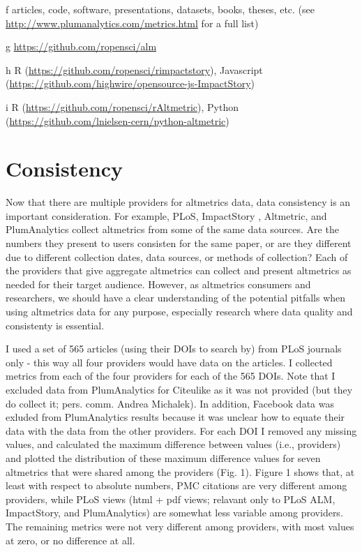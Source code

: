\documentclass[letterpaper,superscriptaddress,showkeys,longbibliography]{revtex4-1}\usepackage{graphicx, color}
\begin{document}
\begin{table}[!ht]
\begin{threeparttable}[b]
\begin{tablenotes}
            \item[f] articles, code, software, presentations, datasets, books, theses, etc. (see \url{http://www.plumanalytics.com/metrics.html} for a full list)
            \item[g] \url{https://github.com/ropensci/alm}
            \item[h] R (\url{https://github.com/ropensci/rimpactstory}), Javascript (\url{https://github.com/highwire/opensource-js-ImpactStory})
            \item[i] R (\url{https://github.com/ropensci/rAltmetric}), Python (\url{https://github.com/lnielsen-cern/python-altmetric})
        \end{tablenotes}
    \end{threeparttable}
\end{table}


\section*{Consistency}

Now that there are multiple providers for altmetrics data, data consistency is an important consideration. For example, PLoS, ImpactStory , Altmetric, and PlumAnalytics collect altmetrics from some of the same data sources. Are the numbers they present to users consisten for the same paper, or are they different due to different collection dates, data sources, or methods of collection? Each of the  providers that give aggregate altmetrics can collect and present altmetrics as needed for their target audience. However, as altmetrics consumers and researchers, we should have a clear understanding of the potential pitfalls when using altmetrics data for any purpose, especially research where data quality and consistenty is essential. 

I used a set of 565 articles (using their DOIs to search by) from PLoS journals only - this way all four providers would have data on the articles. I collected metrics from each of the four providers for each of the 565 DOIs. Note that I excluded data from PlumAnalytics for Citeulike as it was not provided (but they do collect it; pers. comm. Andrea Michalek). In addition, Facebook data was exluded from PlumAnalytics results because it was unclear how to equate their data with the data from the other providers. For each DOI I removed any missing values, and calculated the maximum difference between values (i.e., providers) and plotted the distribution of these maximum difference values for seven altmetrics that were shared among the providers (Fig. 1). Figure 1 shows that, at least with respect to absolute numbers, PMC citations are very different among providers, while PLoS views (html + pdf views; relavant only to PLoS ALM, ImpactStory, and PlumAnalytics) are somewhat less variable among providers. The remaining metrics were not very different among providers, with most values at zero, or no difference at all. 
\end{document}

